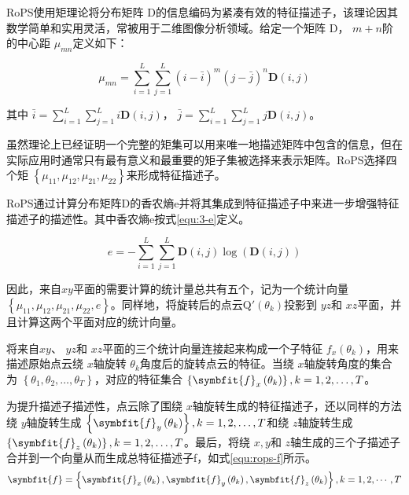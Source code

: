RoPS使用矩理论将分布矩阵 $\mathrm{D}$的信息编码为紧凑有效的特征描述子，该理论因其数学简单和实用灵活，常被用于二维图像分析领域。给定一个矩阵 $\mathrm{D}$， $m+n$阶的中心距 $\mu_{mn}$定义如下：

\begin{equation}
    \mu_{m n}=\sum_{i=1}^{L} \sum_{j=1}^{L}(i-\bar{i})^{m}(j-\bar{j})^{n} \mathbf{D}(i, j)
\end{equation}

其中 $\bar{i}=\sum_{i=1}^{L} \sum_{j=1}^{L} i \mathbf{D}(i, j)$， $\bar{j}= \sum_{i=1}^{L} \sum_{j=1}^{L} j \mathbf{D}(i, j)$。

虽然理论上已经证明一个完整的矩集可以用来唯一地描述矩阵中包含的信息，但在实际应用时通常只有最有意义和最重要的矩子集被选择来表示矩阵。RoPS选择四个矩 $\left \{ \mu_{11},\mu_{12},\mu_{21},\mu_{22} \right \}$来形成特征描述子。

RoPS通过计算分布矩阵D的香农熵e并将其集成到特征描述子中来进一步增强特征描述子的描述性。其中香农熵e按式\ref{equ:3-e}定义。

\begin{equation}\label{equ:3-e}
    e=-\sum_{i=1}^{L} \sum_{j=1}^{L} \mathbf{D}(i, j) \log (\mathbf{D}(i, j))
\end{equation}


因此，来自$xy$平面的需要计算的统计量总共有五个，记为一个统计向量 $\left \{ \mu_{11},\mu_{12},\mu_{21},\mu_{22},e \right \}$。同样地，将旋转后的点云$\mathrm{Q'}\left(\theta_{k}\right)$投影到 $yz$和 $xz$平面，并且计算这两个平面对应的统计向量。

将来自$xy$、 $yz$和 $xz$平面的三个统计向量连接起来构成一个子特征 $f_{x} \left( \theta_{k}\right)$，用来描述原始点云绕 $x$轴旋转 $\theta_{k}$角度后的旋转点云的特征。当绕 $x$轴旋转角度的集合为 $\left \{ \theta_{1},\theta_{2},…,\theta_{T} \right \}$，对应的特征集合 $\left\{\symbfit{f}_{x}\left(\theta_{k}\right)\right\}, k=1,2, \ldots, T$。

为提升描述子描述性，点云除了围绕 $x$轴旋转生成的特征描述子，还以同样的方法绕 $y$轴旋转生成 $\left\{\symbfit{f}_{y}\left(\theta_{k}\right)\right\}, k=1,2, \ldots, T$和绕 $z$轴旋转生成 $\left\{\symbfit{f}_{z}\left(\theta_{k}\right)\right\}, k=1,2, \ldots, T$。最后，将绕 $x,y$和 $z$轴生成的三个子描述子合并到一个向量从而生成总特征描述子f，如式\ref{equ:rops-f}所示。 
\begin{equation}\label{equ:rops-f}
    \symbfit{f}=\left\{\symbfit{f}_{x}\left(\theta_{k}\right), \symbfit{f}_{y}\left(\theta_{k}\right), \symbfit{f}_{z}\left(\theta_{k}\right)\right\}, k=1,2, \cdots, T
\end{equation}

